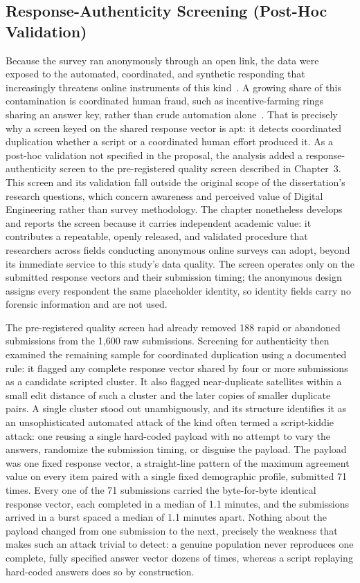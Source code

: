 \subsection{Response-Authenticity Screening (Post-Hoc Validation)}\label{sec:forensic-validation}

Because the survey ran anonymously through an open link, the data were exposed to the automated, coordinated, and synthetic responding that increasingly threatens online instruments of this kind~\parencite{Pozzar_Bots_2020, Griffin_Bots_2022, Westwood_LLM_2025}. A growing share of this contamination is coordinated human fraud, such as incentive-farming rings sharing an answer key, rather than crude automation alone~\parencite{Jaffe_NotBots_2026}. That is precisely why a screen keyed on the shared response vector is apt: it detects coordinated duplication whether a script or a coordinated human effort produced it. As a post-hoc validation not specified in the proposal, the analysis added a response-authenticity screen to the pre-registered quality screen described in Chapter~3. This screen and its validation fall outside the original scope of the dissertation's research questions, which concern awareness and perceived value of Digital Engineering rather than survey methodology. The chapter nonetheless develops and reports the screen because it carries independent academic value: it contributes a repeatable, openly released, and validated procedure that researchers across fields conducting anonymous online surveys can adopt, beyond its immediate service to this study's data quality. The screen operates only on the submitted response vectors and their submission timing; the anonymous design assigns every respondent the same placeholder identity, so identity fields carry no forensic information and are not used.

The pre-registered quality screen had already removed 188 rapid or abandoned submissions from the 1{,}600 raw submissions. Screening for authenticity then examined the remaining sample for coordinated duplication using a documented rule: it flagged any complete response vector shared by four or more submissions as a candidate scripted cluster. It also flagged near-duplicate satellites within a small edit distance of such a cluster and the later copies of smaller duplicate pairs. A single cluster stood out unambiguously, and its structure identifies it as an unsophisticated automated attack of the kind often termed a script-kiddie attack: one reusing a single hard-coded payload with no attempt to vary the answers, randomize the submission timing, or disguise the payload. The payload was one fixed response vector, a straight-line pattern of the maximum agreement value on every item paired with a single fixed demographic profile, submitted 71 times. Every one of the 71 submissions carried the byte-for-byte identical response vector, each completed in a median of 1.1 minutes, and the submissions arrived in a burst spaced a median of 1.1 minutes apart. Nothing about the payload changed from one submission to the next, precisely the weakness that makes such an attack trivial to detect: a genuine population never reproduces one complete, fully specified answer vector dozens of times, whereas a script replaying hard-coded answers does so by construction.

